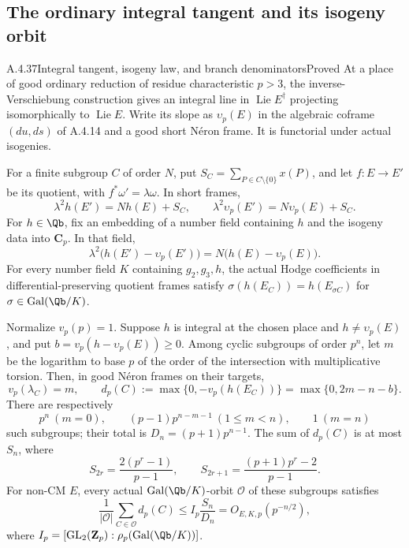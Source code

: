 \subsection{The ordinary integral tangent and its isogeny orbit}

\begin{result}{A.4.37}{Integral tangent, isogeny law, and branch denominators}{Proved}
At a place of good ordinary reduction of residue characteristic
$p>3$, the inverse-Verschiebung construction gives an integral line
in $\operatorname{Lie}E^\dagger$ projecting isomorphically to
$\operatorname{Lie}E$. Write its slope as $\upsilon_p(E)$ in the
algebraic coframe $(du,ds)$ of A.4.14 and a good short N\'eron frame.
It is functorial under actual isogenies.

For a finite subgroup $C$ of order $N$, put
$S_C=\sum_{P\in C\setminus\{0\}}x(P)$, and let $f:E\to E'$ be its
quotient, with $f^*\omega'=\lambda\omega$. In short frames,
\[
 \lambda^2h(E')=Nh(E)+S_C,\qquad
 \lambda^2\upsilon_p(E')=N\upsilon_p(E)+S_C.
\]
For $h\in\Qb$, fix an embedding of a number field containing
$h$ and the isogeny data into $\mathbf C_p$. In that field,
\begin{equation}\label{ell:ordinary-isogeny-difference}
 \lambda^2\bigl(h(E')-\upsilon_p(E')\bigr)
       =N\bigl(h(E)-\upsilon_p(E)\bigr).
\end{equation}
For every number field $K$ containing $g_2,g_3,h$, the actual Hodge
coefficients in differential-preserving quotient frames satisfy
$\sigma(h(E_C))=h(E_{\sigma C})$ for $\sigma\in\operatorname{Gal}(\Qb/K)$.

Normalize $v_p(p)=1$. Suppose $h$ is integral at the chosen place and
$h\ne\upsilon_p(E)$, and put $b=v_p(h-\upsilon_p(E))\ge0$.
Among cyclic subgroups of order $p^n$, let $m$ be the logarithm to
base $p$ of the order of the intersection with multiplicative torsion.
Then, in good N\'eron frames on their targets,
\[
 v_p(\lambda_C)=m,\qquad
 d_p(C):=\max\{0,-v_p(h(E_C))\}=\max\{0,2m-n-b\}.
\]
There are respectively
\[
 p^n\ (m=0),\qquad
 (p-1)p^{n-m-1}\ (1\le m<n),\qquad 1\ (m=n)
\]
such subgroups; their total is $D_n=(p+1)p^{n-1}$.
The sum of $d_p(C)$ is at most $S_n$, where
\[
 S_{2r}=\frac{2(p^r-1)}{p-1},\qquad
 S_{2r+1}=\frac{(p+1)p^r-2}{p-1}.
\]
For non-CM $E$, every actual $\operatorname{Gal}(\Qb/K)$-orbit
$\mathcal O$ of these subgroups satisfies
\[
 \frac1{|\mathcal O|}\sum_{C\in\mathcal O}d_p(C)
       \le I_p\frac{S_n}{D_n}=O_{E,K,p}(p^{-n/2}),
\]
where $I_p=[\mathrm{GL}_2(\mathbf Z_p):\rho_p(\operatorname{Gal}(\Qb/K))]$.
\end{result}

